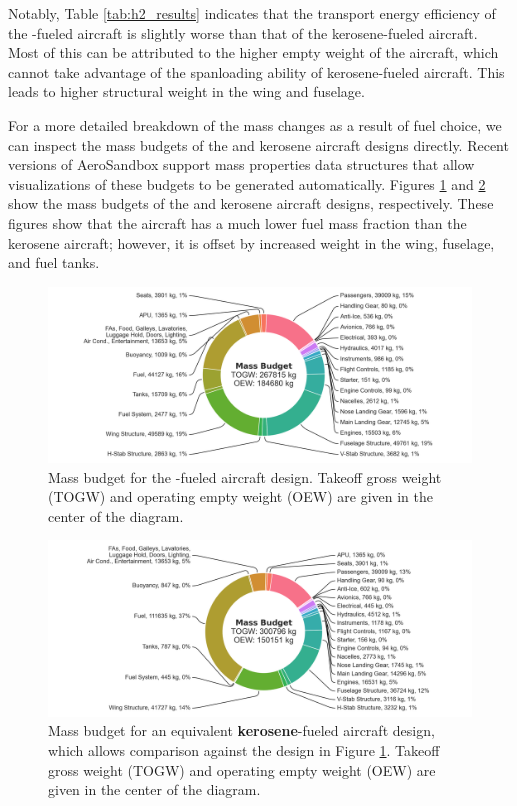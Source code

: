 Notably, Table \ref{tab:h2_results} indicates that the transport energy efficiency of the \lh-fueled aircraft is slightly worse than that of the kerosene-fueled aircraft. Most of this can be attributed to the higher empty weight of the \lh aircraft, which cannot take advantage of the spanloading ability of kerosene-fueled aircraft. This leads to higher structural weight in the wing and fuselage.

For a more detailed breakdown of the mass changes as a result of fuel choice, we can inspect the mass budgets of the \lh and kerosene aircraft designs directly. Recent versions of AeroSandbox support mass properties data structures that allow visualizations of these budgets to be generated automatically. Figures \ref{fig:h2_mass_budget} and \ref{fig:kerosene_mass_budget} show the mass budgets of the \lh and kerosene aircraft designs, respectively. These figures show that the \lh aircraft has a much lower fuel mass fraction than the kerosene aircraft; however, it is offset by increased weight in the wing, fuselage, and fuel tanks.

\begin{figure}[h]
    \centering
    \includegraphics[width=\textwidth, trim={3in 0 3in 0}]{../figures/Hydrogen/ppt/media/image27.png}
    \caption{Mass budget for the \textbf{\lh}-fueled aircraft design. Takeoff gross weight (TOGW) and operating empty weight (OEW) are given in the center of the diagram.}
    \label{fig:h2_mass_budget}
\end{figure}

\begin{figure}[h]
    \centering
    \includegraphics[width=\textwidth, trim={3in 0 3in 0}]{../figures/Hydrogen/ppt/media/image26.png}
    \caption{Mass budget for an equivalent \textbf{kerosene}-fueled aircraft design, which allows comparison against the \lh design in Figure \ref{fig:h2_mass_budget}. Takeoff gross weight (TOGW) and operating empty weight (OEW) are given in the center of the diagram.}
    \label{fig:kerosene_mass_budget}
\end{figure}


